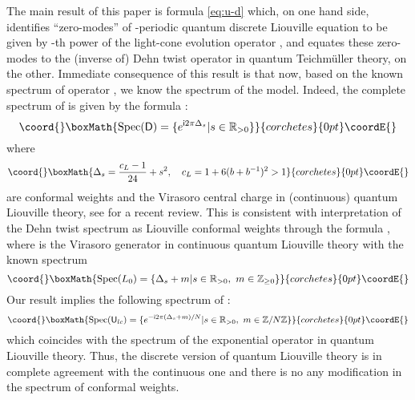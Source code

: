 \documentclass[a4paper,draft]{amsart}
\theoremstyle{definition}
\theoremstyle{remark}
\providecommand{\DEHN}{\mathsf D}
\providecommand{\IMUN}{\mathsf i}
\providecommand{\INTEGERS}{\mathbb Z}
\providecommand{\la}{b}
\providecommand{\LC}{\mathsf U_{lc}}
\providecommand{\REALS}{\mathbb R}
\providecommand{\Spec}{\mathop{\mathrm{Spec}}}
\begin{document}
The main result of this paper is formula \eqref{eq:u-d}
which, on one hand side, identifies ``zero-modes'' of \coordHE{}-periodic
quantum discrete 
Liouville equation to be given by \coordHE{}-th power of the light-cone
evolution operator \myHighlight{$\LC$}\coordHE{}, and equates these
zero-modes to the (inverse 
of) Dehn twist operator in quantum Teichm\"uller theory, on the other.
Immediate consequence of this result is that now, based on the
known spectrum of operator \myHighlight{$\DEHN$}\coordHE{}, we know the
spectrum of the model. Indeed, the 
complete spectrum of \myHighlight{$\DEHN$}\coordHE{} is given by the formula \cite{kash3}:
\[\coord{}\boxMath{
\Spec(\DEHN)=\{e^{\IMUN2\pi\Delta_s}|s\in\REALS_{>0}\}
}{corchetes}{0pt}\coordE{}\]
where
\[\coord{}\boxMath{
\Delta_s=\frac{c_L-1}{24}+s^2,\quad c_L=1+6(\la+\la^{-1})^2>1
}{corchetes}{0pt}\coordE{}\]
are conformal weights and the Virasoro central charge in (continuous) quantum
Liouville theory, see \cite{tesch} for a recent review. 
This is consistent with interpretation of the Dehn
twist spectrum as Liouville conformal weights through the formula
\myHighlight{$\Spec(\DEHN)=\Spec( e^{\IMUN2\pi L_0})$}\coordHE{}, where \coordHE{} is the Virasoro
generator in continuous quantum Liouville theory with the known
spectrum
\[\coord{}\boxMath{
\Spec(L_0)=\{\Delta_s+m|s\in\REALS_{>0},\ m\in\INTEGERS_{\ge 0}\}
}{corchetes}{0pt}\coordE{}\]
Our result implies the following spectrum of \myHighlight{$\LC$}\coordHE{}:
\[\coord{}\boxMath{
\Spec(\LC)=\{e^{-\IMUN2\pi (\Delta_s+m)/N}|s\in\REALS_{>0},\ m
\in\INTEGERS/N\INTEGERS\}
}{corchetes}{0pt}\coordE{}\]
which coincides with the spectrum of the exponential operator
\myHighlight{$e^{-2\pi\IMUN L_0/N}$}\coordHE{} in quantum Liouville theory.  Thus, the
discrete version of quantum Liouville theory is in complete agreement
with the continuous one and there is no any modification in the
spectrum of conformal weights.
\end{document}
